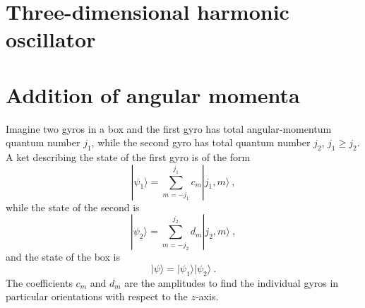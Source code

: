 \documentclass[12pt,a4paper]{article}
\begin{document}
\section{Three-dimensional harmonic oscillator}
\cite{binney2013physics} 

















\section{Addition of angular momenta}
\cite{binney2013physics} Imagine two gyros in a box and the first gyro has total angular-momentum quantum number $j_1$, while the second gyro has total quantum number $j_2$, $j_1 \geqslant j_2$. A ket describing the state of the first gyro is of the
form
\begin{equation}
|\psi_1 \rangle  = \sum_{m = -j_1}^{j_1} c_m |j_1, m \rangle ~,
\end{equation}
while the state of the second is
\begin{equation}
|\psi_2 \rangle  = \sum_{m = -j_2}^{j_2} d_m |j_2, m \rangle ~,
\end{equation}
and the state of the box is
\begin{equation}
|\psi \rangle = |\psi_1 \rangle |\psi_2 \rangle  ~.
\end{equation}
The coefficients $c_m$ and $d_m$ are the amplitudes to find the individual gyros in particular orientations with respect to the $z$-axis.
\end{document}

